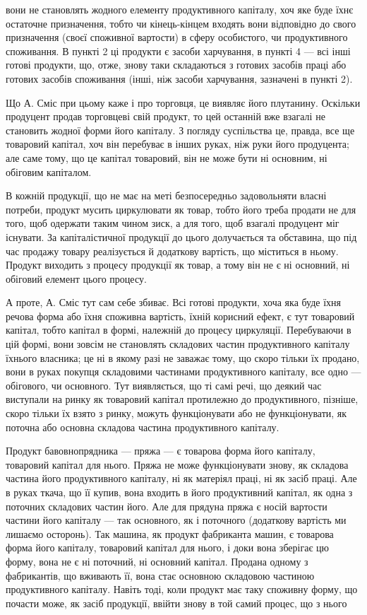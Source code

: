 \parcont{}  %
вони не становлять жодного елементу продуктивного капіталу, хоч яке
буде їхнє остаточне призначення, тобто чи кінець-кінцем входять вони
відповідно до свого призначення (своєї споживної вартости) в сферу особистого,
чи продуктивного споживання. В пункті 2 ці продукти є засоби
харчування, в пункті 4 — всі інші готові продукти, що, отже, знову таки
складаються з готових засобів праці або готових засобів споживання
(інші, ніж засоби харчування, зазначені в пункті 2).

Що А. Сміс при цьому каже і про торговця, це виявляє його плутанину.
Оскільки продуцент продав торговцеві свій продукт, то цей останній
вже взагалі не становить жодної форми його капіталу. З погляду
суспільства це, правда, все ще товаровий капітал, хоч він перебуває в
інших руках, ніж руки його продуцента; але саме тому, що це капітал
товаровий, він не може бути ні основним, ні обіговим капіталом.

В кожній продукції, що не має на меті безпосередньо задовольняти
власні потреби, продукт мусить циркулювати як товар, тобто його
треба продати не для того, щоб одержати таким чином зиск, а для того,
щоб взагалі продуцент міг існувати. За капіталістичної продукції до
цього долучається та обставина, що під час продажу товару реалізується
й додаткову вартість, що міститься в ньому. Продукт виходить з процесу
продукції як товар, а тому він не є ні основний, ні обіговий елемент
цього процесу.

А проте, А. Сміс тут сам себе збиває. Всі готові продукти, хоча
яка буде їхня речова форма або їхня споживна вартість, їхній корисний
ефект, є тут товаровий капітал, тобто капітал в формі, належній до процесу
циркуляції. Перебуваючи в цій формі, вони зовсім не становлять
складових частин продуктивного капіталу їхнього власника; це ні в якому
разі не заважає тому, що скоро тільки їх продано, вони  в
руках покупця складовими частинами продуктивного капіталу, все одно —
обігового, чи основного. Тут виявляється, що ті самі речі, що деякий
час виступали на ринку як товаровий капітал протилежно до продуктивного,
пізніше, скоро тільки їх взято з ринку, можуть функціонувати або
не функціонувати, як поточна або основна складова частина продуктивного
капіталу.

Продукт бавовнопрядника — пряжа — є товарова форма його капіталу,
товаровий капітал для нього. Пряжа не може функціонувати знову, як
складова частина його продуктивного капіталу, ні як матеріял праці, ні
як засіб праці. Але в руках ткача, що її купив, вона входить в його
продуктивний капітал, як одна з поточних складових частин його. Але
для прядуна пряжа є носій вартости частини його капіталу — так основного,
як і поточного (додаткову вартість ми лишаємо осторонь). Так
машина, як продукт фабриканта машин, є товарова форма його капіталу,
товаровий капітал для нього, і доки вона зберігає цю форму, вона не є
ні поточний, ні основний капітал. Продана одному з фабрикантів, що
вживають її, вона стає основною складовою частиною продуктивного капіталу.
Навіть тоді, коли продукт має таку споживну форму, що почасти
може, як засіб продукції, ввійти знову в той самий процес, що з нього
\parbreak{}  %
